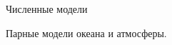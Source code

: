 \begin{chapter}{Численные модели}
\begin{section}{Парные модели океана и атмосферы.}







\end{section}
\end{chapter}
